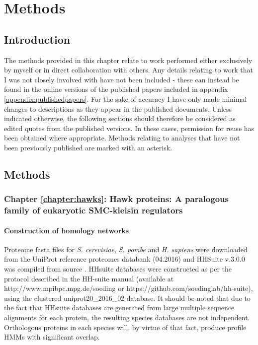 \documentclass[a4paper,11pt,twoside,openright]{scrbook}
\begin{document}
\chapter{Methods}\label{chapter:methods}

\section{Introduction}
The methods provided in this chapter relate to work performed either exclusively by myself or in direct collaboration with others. Any details relating to work that I was not closely involved with have not been included - these can instead be found in the online versions of the published papers included in appendix \ref{appendix:publishedpapers}. For the sake of accuracy I have only made minimal changes to descriptions as they appear in the published documents. Unless indicated otherwise, the following sections should therefore be considered as edited quotes from the published versions. In these cases, permission for reuse has been obtained where appropriate. Methods relating to analyses that have not been previously published are marked with an asterisk.

\section{Methods}

\subsection{Chapter \ref*{chapter:hawks}: Hawk proteins: A paralogous family of eukaryotic SMC-kleisin regulators}

\subsubsection{Construction of homology networks}
Proteome fasta files for \textit{S. cerevisiae}, \textit{S. pombe} and \textit{H. sapiens} were downloaded from the UniProt reference proteomes databank \cite{Consortium2017} (04.2016) and HHSuite v.3.0.0 was compiled from source \cite{Soding2005,Remmert2011}. HHsuite databases were constructed as per the protocol described in the HH-suite manual (available at http://www.mpibpc.mpg.de/soeding or https://github.com/soedinglab/hh-suite), using the clustered uniprot20\_2016\_02 database. It should be noted that due to the fact that HHsuite databases are generated from large multiple sequence alignments for each protein, the resulting species databases are not independent. Orthologous proteins in each species will, by virtue of that fact, produce profile HMMs with significant overlap.
\end{document}
